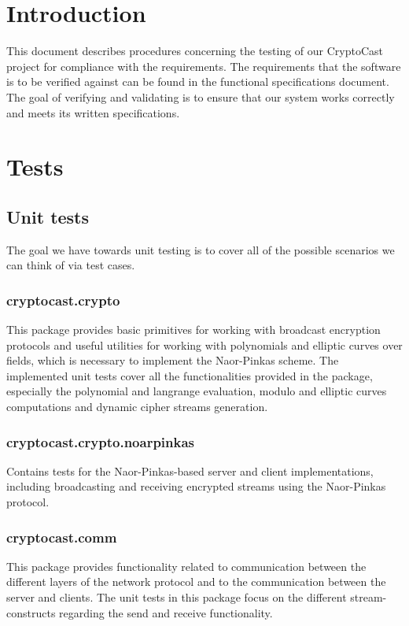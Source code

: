 \documentclass[a4paper,10pt]{scrartcl}
\title{\doctitle}
\author{\authorName}
\date{\today}
\begin{document}

\tableofcontents
\clearpage

\section{Introduction}
This document describes procedures concerning the testing of our CryptoCast project for compliance with the requirements. The requirements that the software is to be verified against can be found in the functional specifications document. The goal of verifying and validating is to ensure that our system works correctly and meets its written specifications.

\section{Tests}
\subsection{Unit tests}
The goal we have towards unit testing is to cover all of the possible scenarios we can think of via test cases.

\subsubsection{cryptocast.crypto} This package provides basic primitives for working with broadcast encryption protocols and useful utilities for working with polynomials and elliptic curves over fields, which is necessary to implement the Naor-Pinkas scheme.
The implemented unit tests cover all the functionalities provided in the package, especially the polynomial and langrange evaluation, modulo and elliptic curves computations and dynamic cipher streams generation.
\subsubsection{cryptocast.crypto.noarpinkas}
Contains tests for the Naor-Pinkas-based server and client implementations, including broadcasting and receiving encrypted streams using the Naor-Pinkas protocol.
\subsubsection{cryptocast.comm}
This package provides functionality related to communication between the different layers of the network protocol and to the communication between the server and clients. The unit tests in this package focus on the different stream-constructs regarding the send and receive functionality.
\end{document}
